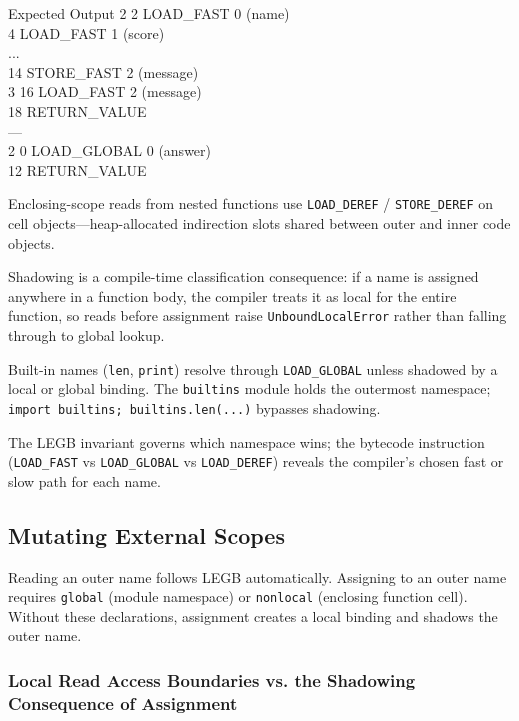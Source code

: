 \documentclass[a4paper,twoside]{report}
\begin{document}
\begin{iobox}{Expected Output}
  2           2 LOAD\_FAST                0 (name) \\
              4 LOAD\_FAST                1 (score) \\
             ... \\
             14 STORE\_FAST               2 (message) \\
  3          16 LOAD\_FAST                2 (message) \\
             18 RETURN\_VALUE \\
--- \\
  2           0 LOAD\_GLOBAL              0 (answer) \\
             12 RETURN\_VALUE \\
\end{iobox}




Enclosing-scope reads from nested functions use \texttt{LOAD\_DEREF} / \texttt{STORE\_DEREF} on cell objects---heap-allocated indirection slots shared between outer and inner code objects.

Shadowing is a compile-time classification consequence: if a name is assigned anywhere in a function body, the compiler treats it as local for the entire function, so reads before assignment raise \texttt{UnboundLocalError} rather than falling through to global lookup.

Built-in names (\texttt{len}, \texttt{print}) resolve through \texttt{LOAD\_GLOBAL} unless shadowed by a local or global binding. The \texttt{builtins} module holds the outermost namespace; \texttt{import builtins; builtins.len(...)} bypasses shadowing.

The LEGB invariant governs which namespace wins; the bytecode instruction (\texttt{LOAD\_FAST} vs \texttt{LOAD\_GLOBAL} vs \texttt{LOAD\_DEREF}) reveals the compiler's chosen fast or slow path for each name.


\subsection{Mutating External Scopes}

Reading an outer name follows LEGB automatically. Assigning to an outer name requires \texttt{global} (module namespace) or \texttt{nonlocal} (enclosing function cell). Without these declarations, assignment creates a local binding and shadows the outer name.

\subsubsection{Local Read Access Boundaries vs. the Shadowing Consequence of Assignment}
\end{document}
